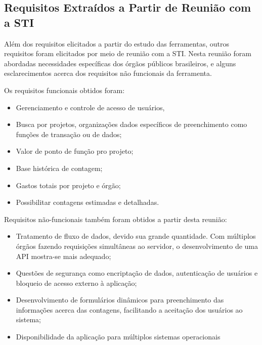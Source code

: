 \subsection{Requisitos Extraídos a Partir de Reunião com a STI}

Além dos requisitos elicitados a partir do estudo das ferramentas, outros requisitos foram elicitados por meio de reunião com a STI. Nesta reunião foram abordadas necessidades específicas dos órgãos públicos brasileiros, e alguns esclarecimentos acerca dos requisitos não funcionais da ferramenta.

Os requisitos funcionais obtidos foram:

\begin{itemize}

  \item Gerenciamento e controle de acesso de usuários,

  \item Busca por projetos, organizações  dados específicos de preenchimento
  como funções de transação ou de dados;

  \item Valor de ponto de função pro projeto;

  \item Base histórica de contagem;

  \item Gastos totais por projeto e órgão;

  \item Possibilitar contagens estimadas e detalhadas.

\end{itemize}

Requisitos não-funcionais também foram obtidos a partir desta reunião:

\begin{itemize}

  \item Tratamento de fluxo de dados, devido sua grande quantidade. Com múltiplos órgãos fazendo requisições simultâneas ao servidor, o desenvolvimento de uma API mostra-se mais adequado;

  \item Questões de segurança como encriptação de dados, autenticação de usuários e bloqueio de acesso externo à aplicação;

  \item Desenvolvimento de formulários dinâmicos para preenchimento das informações acerca das contagens, facilitando a aceitação dos usuários ao sistema;

  \item Disponibilidade da aplicação para múltiplos sistemas operacionais

\end{itemize}


